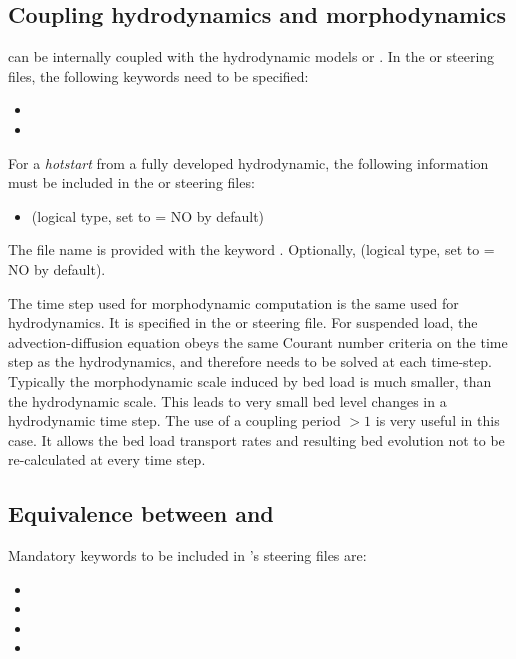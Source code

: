 \subsection{Coupling hydrodynamics and morphodynamics}
\gaia{} can be internally coupled with the hydrodynamic models  or . In the  or  steering files, the following keywords need to be specified:
\begin{itemize}
\item {}
\item {}
\end{itemize}
For a \textit{hotstart} from a fully developed hydrodynamic, the following information must be included in the  or  steering files:
\begin{itemize}
\item {} (logical type, set to {\ttfamily = NO} by default)
\end{itemize}
The file name is provided with the keyword . Optionally,  (logical type, set to {\ttfamily = NO} by default).

The time step used for morphodynamic computation is the same used for hydrodynamics. It is specified in the  or  steering file. For suspended load, the advection-diffusion equation obeys the same Courant number criteria on the time step as the hydrodynamics, and therefore needs to be solved at each time-step. Typically the morphodynamic scale induced by bed load is much smaller, than the hydrodynamic scale. This leads to very small bed level changes in a hydrodynamic time step. The use of a coupling period $>1$ is  very useful in this case. It allows the bed load transport rates and resulting bed evolution not to be re-calculated at every time step.

\subsection{Equivalence between \gaia{} and \sisyphe{}}
Mandatory keywords to be included in \gaia{}'s steering files are:
\begin{itemize}
\item {}
\item {}
\item {}
\item {}
\end{itemize}


